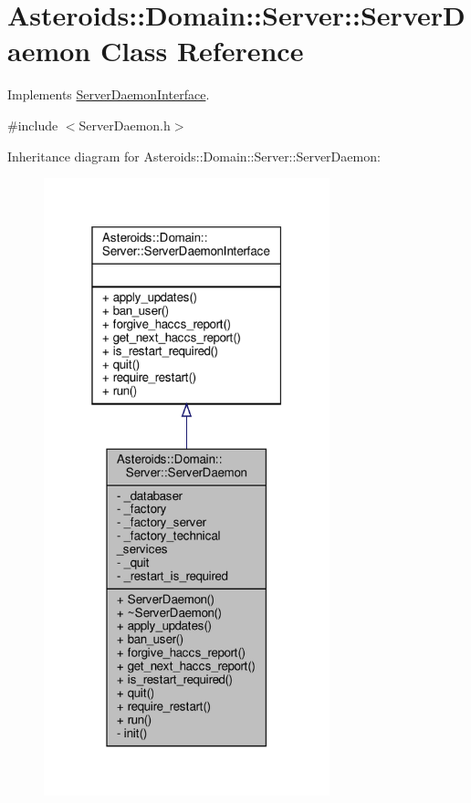 \hypertarget{classAsteroids_1_1Domain_1_1Server_1_1ServerDaemon}{}\section{Asteroids\+:\+:Domain\+:\+:Server\+:\+:Server\+Daemon Class Reference}
\label{classAsteroids_1_1Domain_1_1Server_1_1ServerDaemon}


Implements \hyperlink{classAsteroids_1_1Domain_1_1Server_1_1ServerDaemonInterface}{Server\+Daemon\+Interface}.  




{\ttfamily \#include $<$Server\+Daemon.\+h$>$}



Inheritance diagram for Asteroids\+:\+:Domain\+:\+:Server\+:\+:Server\+Daemon\+:\nopagebreak
\begin{figure}[H]
\begin{center}
\leavevmode
\includegraphics[width=235pt]{classAsteroids_1_1Domain_1_1Server_1_1ServerDaemon__inherit__graph}
\end{center}
\end{figure}



